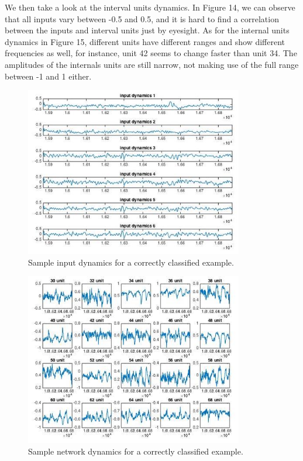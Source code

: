 \documentclass[a4paper,11pt,oneside]{article}
\begin{document}
We then take a look at the interval units dynamics. In Figure 14, we can observe that all inputs vary between -0.5 and 0.5, and it is hard to find a correlation between the inputs and interval units just by eyesight. As for the internal units dynamics in Figure 15, different units have different ranges and show different frequencies as well, for instance, unit 42 seems to change faster than unit 34. The amplitudes of the internals units are still narrow, not making use of the full range between -1 and 1 either.
\begin{figure}[h!]
	\centering
	\includegraphics[width=0.85\textwidth]{img/rightIns2}
	\caption{Sample input dynamics for a correctly classified example.}
\end{figure}
\begin{figure}[h!]
	\centering
	\includegraphics[width=0.85\textwidth]{img/rightIns}
	\caption{Sample network dynamics for a correctly classified example.}
\end{figure}
\end{document}
